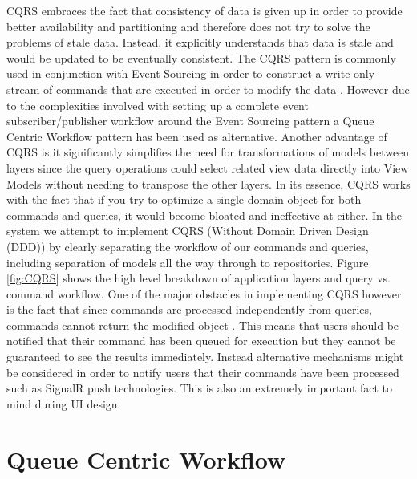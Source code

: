 CQRS embraces the fact that consistency of data is given up in order to provide better availability and partitioning and therefore does not try to solve the problems of stale data. Instead, it explicitly understands that data is stale and would be updated to be eventually consistent. The CQRS pattern is commonly used in conjunction with Event Sourcing in order to construct a write only stream of commands that are executed in order to modify the data \cite{Swanson}. However due to the complexities involved with setting up a complete event subscriber/publisher workflow around the Event Sourcing pattern a Queue Centric Workflow pattern has been used as alternative. Another advantage of CQRS is it significantly simplifies the need for transformations of models between layers since the query operations could select related view data directly into View Models without needing to transpose the other layers. In its essence, CQRS works with the fact that if you try to optimize a single domain object for both commands and queries, it would become bloated and ineffective at either. In the system we attempt to implement CQRS (Without Domain Driven Design (DDD)) by clearly separating the workflow of our commands and queries, including separation of models all the way through to repositories. Figure \ref{fig:CQRS} shows the high level breakdown of application layers and query vs. command workflow. One of the major obstacles in implementing CQRS however is the fact that since commands are processed independently from queries, commands cannot return the modified object \cite{Swanson}. This means that users should be notified that their command has been queued for execution but they cannot be guaranteed to see the results immediately. Instead alternative mechanisms might be considered in order to notify users that their commands have been processed such as SignalR push technologies. This is also an extremely important fact to mind during UI design.
 
 
 \section{Queue Centric Workflow}
 
